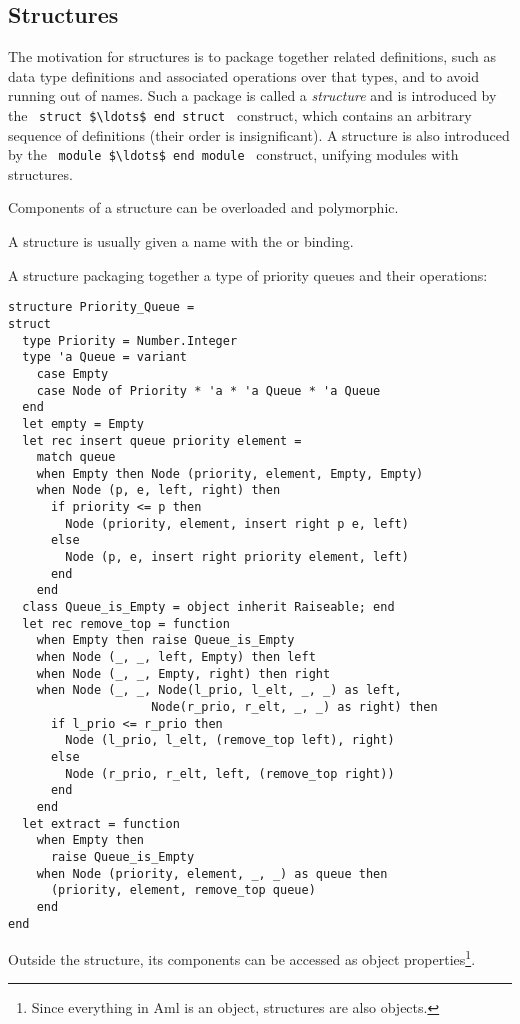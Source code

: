 \subsection{Structures}

The motivation for structures is to package together related definitions, such as data type definitions and associated operations over that types, and to avoid running out of names. Such a package is called a {\em structure} and is introduced by the ~\lstinline!struct $\ldots$ end struct!~ construct, which contains an arbitrary sequence of definitions (their order is insignificant). A structure is also introduced by the ~\lstinline!module $\ldots$ end module!~ construct, unifying modules with structures. 

Components of a structure can be overloaded and polymorphic. 

A structure is usually given a name with the  or  binding. 

\example A structure packaging together a type of priority queues and their operations:
\begin{lstlisting}
structure Priority_Queue =
struct
  type Priority = Number.Integer
  type 'a Queue = variant 
    case Empty
    case Node of Priority * 'a * 'a Queue * 'a Queue
  end
  let empty = Empty
  let rec insert queue priority element =
    match queue
    when Empty then Node (priority, element, Empty, Empty)
    when Node (p, e, left, right) then
      if priority <= p then 
        Node (priority, element, insert right p e, left)
      else 
        Node (p, e, insert right priority element, left)
      end 
    end 
  class Queue_is_Empty = object inherit Raiseable; end
  let rec remove_top = function
    when Empty then raise Queue_is_Empty
    when Node (_, _, left, Empty) then left
    when Node (_, _, Empty, right) then right
    when Node (_, _, Node(l_prio, l_elt, _, _) as left, 
                    Node(r_prio, r_elt, _, _) as right) then
      if l_prio <= r_prio then 
        Node (l_prio, l_elt, (remove_top left), right)
      else 
        Node (r_prio, r_elt, left, (remove_top right))
      end
    end
  let extract = function
    when Empty then 
      raise Queue_is_Empty
    when Node (priority, element, _, _) as queue then
      (priority, element, remove_top queue)
    end 
end 
\end{lstlisting}

Outside the structure, its components can be accessed as object properties\footnote{Since everything in Aml is an object, structures are also objects.}. 

